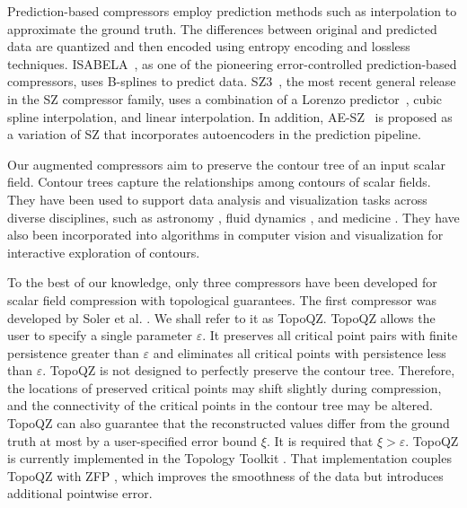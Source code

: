 Prediction-based compressors employ prediction methods such as interpolation to approximate the ground truth. The differences between original and predicted data are quantized and then encoded using entropy encoding and lossless techniques. 
ISABELA~\cite{lakshminarasimhan2013isabela}, as one of the pioneering error-controlled prediction-based compressors, uses B-splines to predict data. 
SZ3~\cite{liang2022sz3,zhao2021optimizing,liang2018error}, the most recent general release in the SZ compressor family, uses a combination of a Lorenzo predictor~\cite{ibarria2003out}, cubic spline interpolation, and linear interpolation. 
In addition, AE-SZ~\cite{liu2021exploring} is proposed as a variation of SZ that incorporates autoencoders in the prediction pipeline.

 Our augmented compressors aim to preserve the contour tree of an input scalar field. 
Contour trees capture the relationships among contours of scalar fields. 
They have been used to support data analysis and visualization tasks across diverse disciplines, such as astronomy \cite{rosen2021using}, fluid dynamics \cite{aydogan2014characterization}, and medicine \cite{aydogan2013analysis, wang2018fast, szymczak2010categorical}. 
They have also been incorporated into algorithms in computer vision \cite{mizuta2005description} and visualization \cite{zhou2009automatic, kopp2022temporal} for interactive exploration of contours.  

To the best of our knowledge, only three compressors have been developed for scalar field compression with topological guarantees. 
The first compressor was developed by Soler et al. \cite{soler2018topologically}. We shall refer to it as TopoQZ. 
TopoQZ allows the user to specify a single parameter $\varepsilon$. 
It preserves all critical point pairs with finite persistence greater than $\varepsilon$ and eliminates all critical points with persistence less than $\varepsilon$. 
TopoQZ is not designed to perfectly preserve the contour tree. Therefore, the locations of preserved critical points may shift slightly during compression, and the connectivity of the critical points in the contour tree may be altered. 
TopoQZ can also guarantee that the reconstructed values differ from the ground truth at most by a user-specified error bound $\xi$. It is required that $\xi > \varepsilon$.
TopoQZ is currently implemented in the Topology Toolkit \cite{TiernyFavelierLevine2017, MasoodBudinFalk2021, leguillou_tvcg24}. That implementation couples TopoQZ with ZFP \cite{lindstrom2014fixed}, which improves the smoothness of the data but introduces additional pointwise error.

